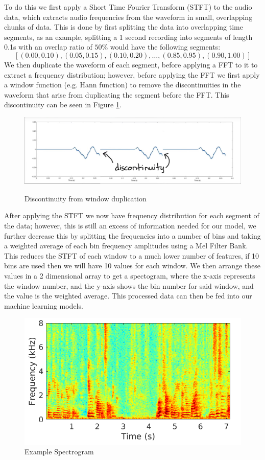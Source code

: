 \documentclass{article}
\begin{document}
To do this we first apply a Short Time Fourier Transform (STFT) to the audio data, which extracts audio frequencies from the waveform in small, overlapping chunks of data. This is done by first splitting the data into overlapping time segments, as an example, splitting a 1 second recording into segments of length 0.1s with an overlap ratio of $50\%$ would have the following segments:
\[
  [(0.00,0.10), (0.05,0.15), (0.10,0.20), \ldots, (0.85,0.95), (0.90,1.00)]
\]
We then duplicate the waveform of each segment, before applying a FFT to it to extract a frequency distribution; however, before applying the FFT we first apply a window function (e.g. Hann function) to remove the discontinuities in the waveform that arise from duplicating the segment before the FFT. This discontinuity can be seen in Figure \ref{fig:discon}. \\

\begin{figure}[h]
    \centering
    \caption{Discontinuity from window duplication}
    \includegraphics[width=0.5\linewidth]{discontinuity example.png}
    \label{fig:discon}
\end{figure}

After applying the STFT we now have frequency distribution for each segment of the data; however, this is still an excess of information needed for our model, we further decrease this by splitting the frequencies into a number of bins and taking a weighted average of each bin frequency amplitudes using a Mel Filter Bank. This reduces the STFT of each window to a much lower number of features, if 10 bins are used then we will have 10 values for each window. We then arrange these values in a 2 dimensional array to get a spectogram, where the x-axis represents the window number, and the y-axis shows the bin number for said window, and the value is the weighted average. This processed data can then be fed into our machine learning models. \\

\begin{figure}[h]
    \centering
    \caption{Example Spectrogram}
    \includegraphics[width=0.5\linewidth]{example_spectrogram.png}
\end{figure}
\end{document}
